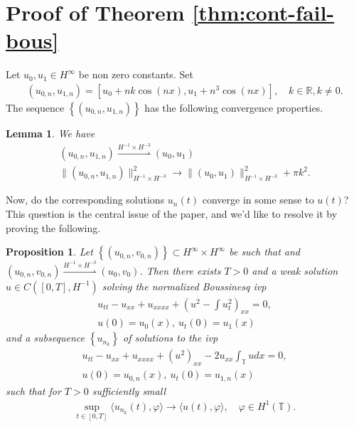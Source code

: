 \documentclass[12pt,reqno]{amsart}
\numberwithin{equation}{section}  %
\newcommand{\rr}{\mathbb{R}}
\newcommand{\ci}{\mathbb{T}}
\newcommand{\vp}{\varphi}
\newtheorem{lemma}[theorem]{Lemma}
\newtheorem{proposition}[theorem]{Proposition}
\begin{document}
\section{Proof of Theorem \ref{thm:cont-fail-bous}}
\label{sec:pf-thm-bous}
Let $u_{0}, u_{1} \in H^{\infty}$ be  non zero constants. Set
%
%
\begin{equation}
  \label{ill-pos-init-data-bous}
\begin{split}
  (u_{0,n}, u_{1,n}) = [u_{0} + nk \cos(nx), u_{1} +
  n^{3} \cos(nx)], \quad k \in \rr, k \neq 0.
\end{split}
\end{equation}
%
The sequence $\left\{ (u_{0,n}, u_{1,n}) \right\}$ has the following convergence properties.
%
%
%
%
%
%
%                
%
%
%
%
\begin{lemma}
We have
%
%
\begin{gather}
  (u_{0,n}, u_{1,n})\overset{H^{-1} \times H^{-3}}{\rightharpoonup} (u_{0},
  u_{1})
  \\
  \| (u_{0,n}, u_{1,n}) \|_{H^{-1} \times H^{-3}}^{2} \to \| (u_{0},
  u_{1}) \|_{H^{-1} \times H^{-3}}^{2} + \pi k^{2}.
\end{gather}
\label{lem:conv-prop-init-bous}
\end{lemma}
%
%
%
%
Now, do the corresponding solutions $u_{n}(t)$ converge in some sense to
$u(t)$? This question is
the central issue of the paper, and we'd like to resolve it by proving the
following.
%
%
%
%
%
%
%
%
\begin{proposition}
  Let $\left\{ (u_{0,n}, v_{0,n}) \right\} \subset
  H^{\infty} \times H^{\infty}$
  be such that and $(u_{0,n}, v_{0,n}) \overset{H^{-1} \times
  H^{-3}}{\rightharpoonup} (u_{0}, v_{0})$.
  Then there exists $T > 0$ and a weak solution $u \in C([0, T],
  H^{-1})$ solving the normalized Boussinesq ivp
  \begin{gather}
    \label{n-bous}
    u_{tt} -u_{xx} + u_{xxxx} + (u^{2} - \int u_{t}^{2})_{xx} = 0,
    \\
    u(0) = u_{0}(x), \ u_{t}(0) = u_{1}(x)
    \label{n-bous-init}
  \end{gather}
  and a subsequence $\left\{ u_{n_{k}} \right\}$ of solutions to the ivp
  \begin{gather}
    u_{tt} - u_{xx} + u_{xxxx} + \left( u^{2} \right )_{xx}  - 2u_{xx}
    \int_{\ci} u dx= 0,
    \\
    u(0) = u_{0,n}(x), \ u_{t}(0) = u_{1,n}(x)
  \end{gather}
%
%
  such that for $T > 0$ sufficiently small
  \begin{equation*}
  \begin{split}
    \sup_{t \in [0, T]} \langle u_{n_{k}}(t), \vp \rangle \to \langle
    u(t), \vp
    \rangle, \quad \vp \in H^{1}(\ci).
  \end{split}
  \end{equation*}
\label{prop:key-paper-bous}
\end{proposition}
\end{document}
